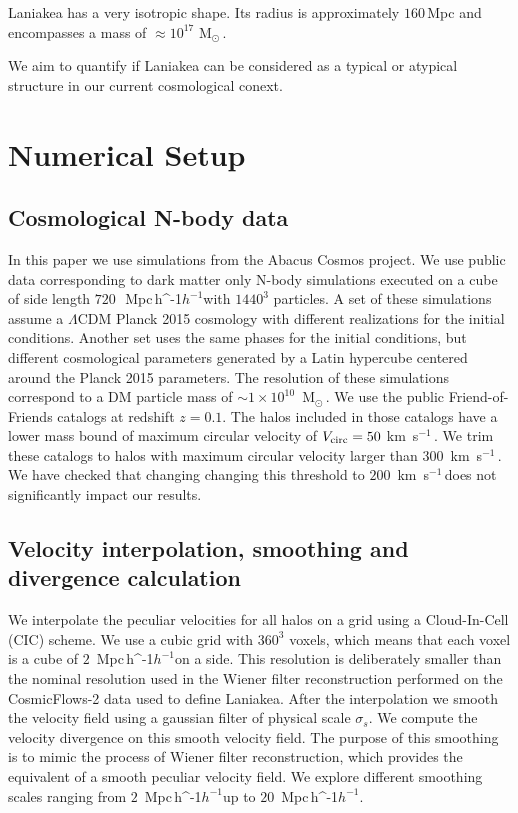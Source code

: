 \documentclass[usenatbib]{mnras}
\newcommand{\Msun}{\,{\rm M}$_{\odot}$\,}
\newcommand{\Mpch}{\,{\rm Mpc}\,\ifmmode h^{-1}\else $h^{-1}$\fi}
\newcommand{\kms}{\,{\rm km}\ s$^{-1}$\,}
\begin{document}
Laniakea has a very isotropic shape. 
Its radius is approximately $160$\,Mpc and encompasses a mass of
$\approx 10^{17}$\,\Msun.

We aim to quantify if Laniakea can be considered as a typical or atypical 
structure in our current cosmological conext.



\section{Numerical Setup}
\label{sec:numerical_setup}
\subsection{Cosmological N-body data}


In this paper we use simulations from the Abacus Cosmos project.
We use public data corresponding to dark matter only N-body simulations executed on a cube of side length $720$\ \Mpch with $1440^3$ particles. 
A set of these simulations assume a $\Lambda$CDM Planck 2015 cosmology with different realizations for the initial conditions.
Another set uses the same phases for the initial conditions, but different cosmological parameters generated by a Latin hypercube centered around the Planck 2015 parameters. 
The resolution of these simulations correspond to a DM particle mass
of $\sim 1 \times 10^{10}$ \Msun.
We use the public Friend-of-Friends catalogs at redshift $z=0.1$.
The halos included in those catalogs have a lower mass bound of 
maximum circular velocity of $V_{\rm circ}=50$\,\kms.
We trim these catalogs to halos with maximum circular velocity larger than $300$ \kms.
We have checked that changing changing this threshold to $200$ \kms does not
significantly impact our results.



\subsection{Velocity interpolation, smoothing and divergence calculation}  

We interpolate the peculiar velocities for all halos on a grid using a Cloud-In-Cell (CIC) scheme.
We use a cubic grid with $360^3$ voxels, which means that each voxel is a cube of $2$ \Mpch on a side. 
This resolution is deliberately smaller than the nominal resolution
used in the Wiener filter reconstruction performed on the
CosmicFlows-2 data used to define Laniakea.
After the interpolation we smooth the velocity field using a gaussian filter of physical scale $\sigma_s$. 
We compute the velocity divergence on this smooth velocity field.
The purpose of this smoothing is to mimic the process of Wiener filter reconstruction, which provides the equivalent of a smooth peculiar velocity field.
We explore different smoothing scales ranging from $2$ \Mpch up to $20$ \Mpch. 
\end{document}
